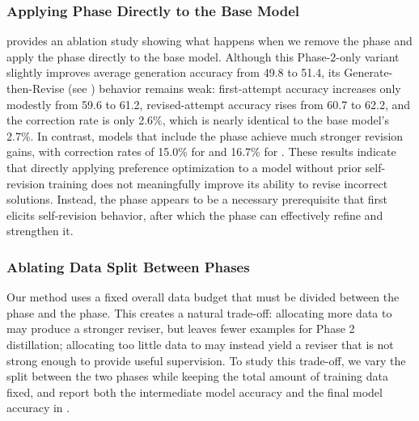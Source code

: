  


\subsubsection{Applying \opsd{} Phase Directly to the Base Model}
 provides an ablation study showing what happens when we remove the \sft{} phase and apply the \opsd{} phase directly to the base model. Although this Phase-2-only variant slightly improves average generation accuracy from 49.8 to 51.4, its Generate-then-Revise (see ) behavior remains weak: first-attempt accuracy increases only modestly from 59.6 to 61.2, revised-attempt accuracy rises from 60.7 to 62.2, and the correction rate is only 2.6\%, which is nearly identical to the base model's 2.7\%. In contrast, models that include the \sft{} phase achieve much stronger revision gains, with correction rates of 15.0\% for \sft{} and 16.7\% for \ours{}. These results indicate that directly applying preference optimization to a model without prior self-revision training does not meaningfully improve its ability to revise incorrect solutions. Instead, the \sft{} phase appears to be a necessary prerequisite that first elicits self-revision behavior, after which the \opsd{} phase can effectively refine and strengthen it.


\subsubsection{Ablating Data Split Between Phases}
Our method uses a fixed overall data budget that must be divided between the \sft{} phase and the \opsd{} phase. This creates a natural trade-off: allocating more data to \sft{} may produce a stronger reviser, but leaves fewer examples for Phase 2 distillation; allocating too little data to \sft{} may instead yield a reviser that is not strong enough to provide useful supervision. To study this trade-off, we vary the split between the two phases while keeping the total amount of training data fixed, and report both the intermediate \sft{} model accuracy and the final \ours{} model accuracy in .

